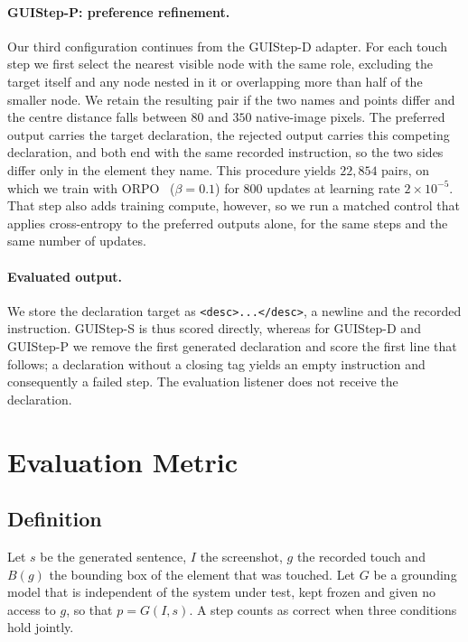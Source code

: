 \documentclass[runningheads,a4paper]{llncs}
\begin{document}
\paragraph{GUIStep-P: preference refinement.}
Our third configuration continues from the GUIStep-D adapter. For each touch step we first select
the nearest visible node with the same role, excluding the target itself and any node nested in it
or overlapping more than half of the smaller node. We retain the resulting pair if the two names
and points differ and the centre distance falls between $80$ and $350$ native-image pixels. The
preferred output carries the target declaration, the rejected output carries this competing
declaration, and both end with the same recorded instruction, so the two sides differ only in the
element they name. This procedure yields $22{,}854$ pairs, on which we train with
ORPO~\cite{orpo} ($\beta=0.1$) for $800$ updates at learning rate $2\times10^{-5}$. That step
also adds training compute, however, so we run a matched control that applies cross-entropy to
the preferred outputs alone, for the same steps and the same number of updates.

\paragraph{Evaluated output.}
We store the declaration target as \texttt{<desc>...\allowbreak</desc>}, a newline and the
recorded instruction. GUIStep-S is thus scored directly, whereas for GUIStep-D and
GUIStep-P we remove the first generated declaration and score the first line that follows; a
declaration without a closing tag yields an empty instruction and consequently a failed step.
The evaluation listener does not receive the declaration.

\section{Evaluation Metric}
\label{sec:metric}

\subsection{Definition}

Let $s$ be the generated sentence, $I$ the screenshot, $g$ the recorded touch and $B(g)$ the
bounding box of the element that was touched. Let $G$ be a grounding model that is independent of
the system under test, kept frozen and given no access to $g$, so that $p=G(I,s)$. A step counts
as correct when three conditions hold jointly.
\end{document}
